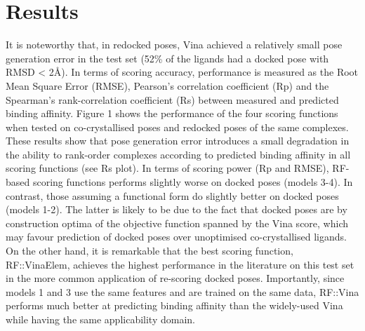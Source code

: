 \section{Results}

It is noteworthy that, in redocked poses, Vina achieved a relatively small pose generation error in the test set (52\% of the ligands had a docked pose with RMSD < 2\AA). In terms of scoring accuracy, performance is measured as the Root Mean Square Error (RMSE), Pearson’s correlation coefficient (Rp) and the Spearman’s rank-correlation coefficient (Rs) between measured and predicted binding affinity. Figure 1 shows the performance of the four scoring functions when tested on co-crystallised poses and redocked poses of the same complexes. These results show that pose generation error introduces a small degradation in the ability to rank-order complexes according to predicted binding affinity in all scoring functions (see Rs plot). In terms of scoring power (Rp and RMSE), RF-based scoring functions performs slightly worse on docked poses (models 3-4). In contrast, those assuming a functional form do slightly better on docked poses (models 1-2). The latter is likely to be due to the fact that docked poses are by construction optima of the objective function spanned by the Vina score, which may favour prediction of docked poses over unoptimised co-crystallised ligands. On the other hand, it is remarkable that the best scoring function, RF::VinaElem, achieves the highest performance in the literature on this test set in the more common application of re-scoring docked poses. Importantly, since models 1 and 3 use the same features and are trained on the same data, RF::Vina performs much better at predicting binding affinity than the widely-used Vina while having the same applicability domain.

